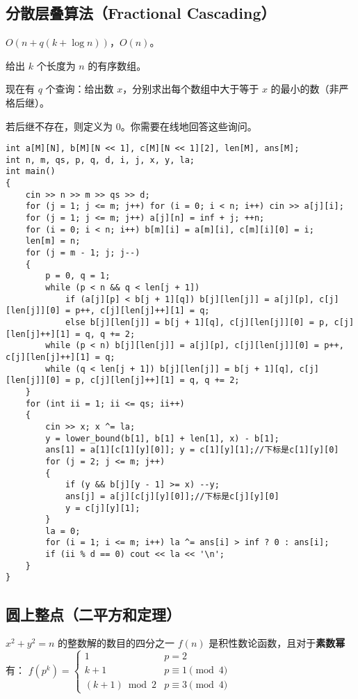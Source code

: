 \documentclass[12pt]{ctexart}
\begin{document}
\subsection{分散层叠算法（Fractional Cascading）}

$O(n+q(k+\log n))$，$O(n)$。

给出 $k$ 个长度为 $n$ 的有序数组。

现在有 $q$ 个查询：给出数 $x$，分别求出每个数组中大于等于 $x$ 的最小的数（非严格后继）。

若后继不存在，则定义为 $0$。你需要在线地回答这些询问。

\begin{lstlisting}
int a[M][N], b[M][N << 1], c[M][N << 1][2], len[M], ans[M];
int n, m, qs, p, q, d, i, j, x, y, la;
int main()
{
	cin >> n >> m >> qs >> d;
	for (j = 1; j <= m; j++) for (i = 0; i < n; i++) cin >> a[j][i];
	for (j = 1; j <= m; j++) a[j][n] = inf + j; ++n;
	for (i = 0; i < n; i++) b[m][i] = a[m][i], c[m][i][0] = i;
	len[m] = n;
	for (j = m - 1; j; j--)
	{
		p = 0, q = 1;
		while (p < n && q < len[j + 1])
			if (a[j][p] < b[j + 1][q]) b[j][len[j]] = a[j][p], c[j][len[j]][0] = p++, c[j][len[j]++][1] = q;
			else b[j][len[j]] = b[j + 1][q], c[j][len[j]][0] = p, c[j][len[j]++][1] = q, q += 2;
		while (p < n) b[j][len[j]] = a[j][p], c[j][len[j]][0] = p++, c[j][len[j]++][1] = q;
		while (q < len[j + 1]) b[j][len[j]] = b[j + 1][q], c[j][len[j]][0] = p, c[j][len[j]++][1] = q, q += 2;
	}
	for (int ii = 1; ii <= qs; ii++)
	{
		cin >> x; x ^= la;
		y = lower_bound(b[1], b[1] + len[1], x) - b[1];
		ans[1] = a[1][c[1][y][0]]; y = c[1][y][1];//下标是c[1][y][0]
		for (j = 2; j <= m; j++)
		{
			if (y && b[j][y - 1] >= x) --y;
			ans[j] = a[j][c[j][y][0]];//下标是c[j][y][0]
			y = c[j][y][1];
		}
		la = 0;
		for (i = 1; i <= m; i++) la ^= ans[i] > inf ? 0 : ans[i];
		if (ii % d == 0) cout << la << '\n';
	}
}

\end{lstlisting}

\subsection{圆上整点（二平方和定理）}

$x^2+y^2=n$ 的整数解的数目的四分之一 $f(n)$ 是积性数论函数，且对于{\bf{素数幂}}有：
$f(p^k)=\begin{cases}
		1            & p=2               \\
		k+1          & p\equiv 1 \pmod 4 \\
		(k+1)\bmod 2 & p\equiv 3 \pmod 4
	\end{cases}$
\end{document}
